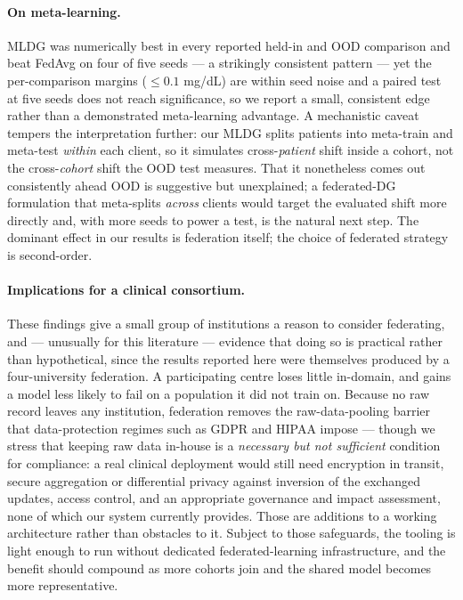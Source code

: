 \documentclass[10pt,letterpaper]{article}
\begin{document}
\paragraph{On meta-learning.} MLDG was numerically best in every reported
held-in and OOD comparison and beat FedAvg on four of five seeds --- a strikingly consistent
pattern --- yet the per-comparison margins ($\le 0.1$ mg/dL) are within seed
noise and a paired test at five seeds does not reach significance, so we report a
small, consistent edge rather than a demonstrated meta-learning advantage. A
mechanistic caveat tempers the interpretation further: our MLDG splits patients
into meta-train and meta-test \emph{within} each client, so it simulates
cross-\emph{patient} shift inside a cohort, not the cross-\emph{cohort} shift the
OOD test measures. That it nonetheless comes out consistently ahead OOD is
suggestive but unexplained; a federated-DG formulation that meta-splits
\emph{across} clients would target the evaluated shift more directly and, with
more seeds to power a test, is the natural next step. The dominant effect in our
results is federation itself; the choice of federated strategy is second-order.

\paragraph{Implications for a clinical consortium.} These findings give a small
group of institutions a reason to consider federating, and --- unusually for this
literature --- evidence that doing so is practical rather than hypothetical, since
the results reported here were themselves produced by a four-university
federation. A participating centre loses little in-domain, and gains a model less
likely to fail on a population it did not train on. Because no raw record leaves
any institution, federation removes the raw-data-pooling barrier that
data-protection regimes such as GDPR and HIPAA impose --- though we stress that
keeping raw data in-house is a \emph{necessary but not sufficient} condition for
compliance: a real clinical deployment would still need encryption in transit,
secure aggregation or differential privacy against inversion of the exchanged
updates, access control, and an appropriate governance and impact assessment, none
of which our system currently provides. Those are additions to a working
architecture rather than obstacles to it. Subject to those safeguards, the tooling
is light enough to run without dedicated federated-learning infrastructure, and
the benefit should compound as more cohorts join and the shared model becomes
more representative.
\end{document}
